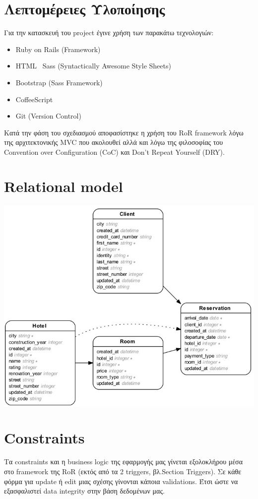 \documentclass[a4paper,12pt]{article}
\begin{document}
\section{Λεπτομέρειες Υλοποίησης}
Για την κατασκευή του project έγινε χρήση των παρακάτω τεχνολογιών:
\begin{itemize}
  \item Ruby on Rails (Framework)
  \item HTML \ Sass (Syntactically Awesome Style Sheets) 
  \item Bootstrap (Sass Framework)
  \item CoffeeScript
  \item Git (Version Control)
\end{itemize}

Κατά την φάση του σχεδιασμού αποφασίστηκε η χρήση του RoR framework λόγω της αρχιτεκτονικής MVC που ακολουθεί αλλά και λόγω της φιλοσοφίας του Convention over Configuration (CoC) και Don't Repeat Yourself (DRY).

\section{Relational model}
\includegraphics[scale=0.7]{ER} 

\section{Constraints}
Τα constraints και η business logic της εφαρμογής μας γίνεται εξολοκλήρου μέσα στο framework της RoR (εκτός από τα 2 triggers, βλ.Section Triggers).
Σε κάθε φόρμα για update ή edit μιας σχέσης γίνονται κάποια validations. Έτσι ώστε να εξασφαλιστεί data integrity στην βάση δεδομένων μας.\\
\end{document}
